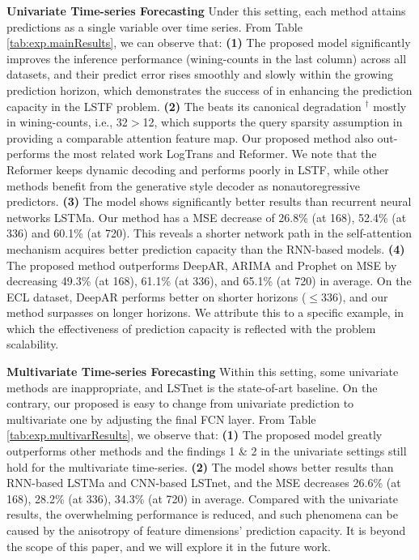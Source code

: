 \textbf{Univariate Time-series Forecasting}
Under this setting, each method attains predictions as a single variable over time series. From Table \ref{tab:exp.mainResults}, we can observe that:
\textbf{(1)} The proposed model {\mn} significantly improves the inference performance (wining-counts in the last column) across all datasets, and their predict error rises smoothly and slowly within the growing prediction horizon, which demonstrates the success of {\mn} in enhancing the prediction capacity in the LSTF problem.
\textbf{(2)} The {\mn} beats its canonical degradation \mn$^{\dag}$ mostly in wining-counts, i.e., 32$>$12, which supports the query sparsity assumption in providing a comparable attention feature map. Our proposed method also out-performs the most related work LogTrans and Reformer. We note that the Reformer keeps dynamic decoding and performs poorly in LSTF, while other methods benefit from the generative style decoder as nonautoregressive predictors.
\textbf{(3)} The {\mn} model shows significantly better results than recurrent neural networks LSTMa. Our method has a MSE decrease of 26.8\% (at 168), 52.4\% (at 336) and 60.1\% (at 720).
This reveals a shorter network path in the self-attention mechanism acquires better prediction capacity than the RNN-based models.
\textbf{(4)} The proposed method outperforms DeepAR, ARIMA and Prophet on MSE by decreasing 49.3\% (at 168), 61.1\% (at 336), and 65.1\% (at 720) in average.
On the ECL dataset, DeepAR performs better on shorter horizons ($\leq 336$), and our method surpasses on longer horizons. We attribute this to a specific example, in which the effectiveness of prediction capacity is reflected with the problem scalability.

\textbf{Multivariate Time-series Forecasting}
Within this setting, some univariate methods are inappropriate, and LSTnet is the state-of-art baseline. On the contrary, our proposed {\mn} is easy to change from univariate prediction to multivariate one by adjusting the final FCN layer.
From Table \ref{tab:exp.multivarResults}, we observe that: \textbf{(1)} The proposed model {\mn} greatly outperforms other methods and the findings 1 \& 2 in the univariate settings still hold for the multivariate time-series.
\textbf{(2)} The {\mn} model shows better results than RNN-based LSTMa and CNN-based LSTnet, and the MSE decreases 26.6\% (at 168), 28.2\% (at 336), 34.3\% (at 720) in average. Compared with the univariate results, the overwhelming performance is reduced, and such phenomena can be caused by the anisotropy of feature dimensions' prediction capacity. It is beyond the scope of this paper, and we will explore it in the future work.

